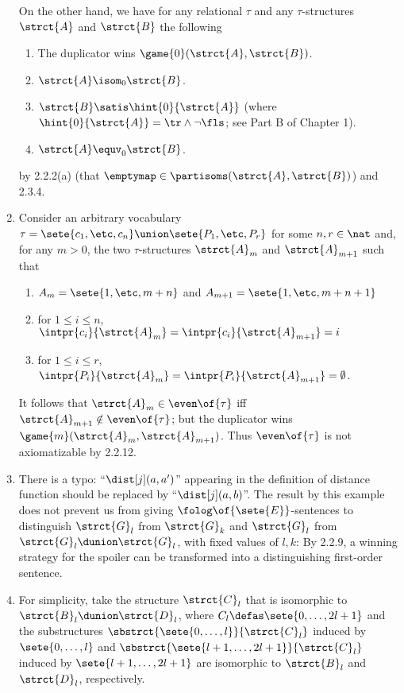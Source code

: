 \begin{enumerate}[1.]
On the other hand, we have for any relational $\tau$ and any $\tau$-structures $\strct{A}$ and $\strct{B}$ the following
\begin{enumerate}[(1)]
\item The duplicator wins $\game{0}(\strct{A}, \strct{B})$.
\item $\strct{A} \isom_0 \strct{B}$.
\item $\strct{B} \satis \hint{0}{\strct{A}}$ (where $\hint{0}{\strct{A}} = \tr \land \neg\fls$; see Part B of Chapter 1).
\item $\strct{A} \equv_0 \strct{B}$.
\end{enumerate}
by 2.2.2(a) (that $\emptymap \in \partisoms(\strct{A}, \strct{B})$) and 2.3.4.
%
\item {} Consider an arbitrary vocabulary $\tau = \sete{c_1, \etc, c_n} \union \sete{P_1, \etc, P_r}$ for some $n, r \in \nat$ and, for any $m > 0$, the two $\tau$-structures $\strct{A}_m$ and $\strct{A}_{m + 1}$ such that
\begin{enumerate}[(1)]
\item $A_m = \sete{1, \etc, m + n}$ and $A_{m + 1} = \sete{1, \etc, m + n + 1}$
\item for $1 \leq i \leq n$, $\intpr{c_i}{\strct{A}_m} = \intpr{c_i}{\strct{A}_{m + 1}} = i$
\item for $1 \leq i \leq r$, $\intpr{P_i}{\strct{A}_m} = \intpr{P_i}{\strct{A}_{m + 1}} = \emptyset$.
\end{enumerate}
It follows that $\strct{A}_m \in \even\of{\tau}$ iff $\strct{A}_{m + 1} \notin \even\of{\tau}$; but the duplicator wins $\game{m}(\strct{A}_m, \strct{A}_{m + 1})$. Thus $\even\of{\tau}$ is not axiomatizable by 2.2.12.
%
\item {} There is a typo: ``$\dist[j](a, a')$'' appearing in the definition of distance function should be replaced by ``$\dist[j](a, b)$''.
\newpar
The result by this example does not prevent us from giving $\folog\of{\sete{E}}$-sentences to distinguish $\strct{G}_l$ from $\strct{G}_k$ and $\strct{G}_l$ from $\strct{G}_l \dunion \strct{G}_l$, with fixed values of $l, k$: By 2.2.9, a winning strategy for the spoiler can be transformed into a distinguishing first-order sentence.
%
\item {} For simplicity, take the structure $\strct{C}_l$ that is isomorphic to $\strct{B}_l \dunion \strct{D}_l$, where $C_l \defas \sete{0, \ldots, 2l + 1}$ and the substructures $\sbstrct{\sete{0, \ldots, l}}{\strct{C}_l}$ induced by $\sete{0, \ldots, l}$ and $\sbstrct{\sete{l + 1, \ldots, 2l + 1}}{\strct{C}_l}$ induced by $\sete{l + 1, \ldots, 2l + 1}$ are isomorphic to $\strct{B}_l$ and $\strct{D}_l$, respectively.

\end{enumerate}
